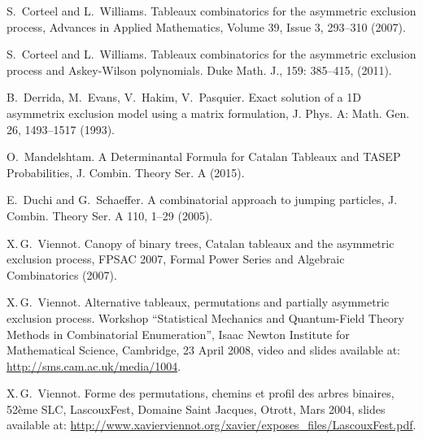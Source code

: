 \documentclass[11pt]{article}
\numberwithin{equation}{section}
\theoremstyle{plain}
\theoremstyle{definition}
\theoremstyle{remark}
\begin{document}
\begin{thebibliography}{99}


 S.~Corteel and L.~Williams. Tableaux combinatorics for the asymmetric exclusion process, Advances in Applied Mathematics, Volume 39, Issue 3, 293--310 (2007).

 S.~Corteel and L.~Williams. Tableaux combinatorics for the asymmetric exclusion process and Askey-Wilson polynomials. Duke Math. J., 159: 385--415, (2011).

 B.~Derrida, M.~Evans, V.~Hakim, V.~Pasquier. Exact solution of a 1D asymmetrix exclusion model using a matrix formulation, J. Phys. A: Math. Gen. 26, 1493--1517 (1993).

 O.~Mandelshtam. A Determinantal Formula for Catalan Tableaux and TASEP Probabilities, J. Combin. Theory Ser. A (2015).

 E.\ Duchi and G.\ Schaeffer. A combinatorial approach to jumping particles, J. Combin. Theory Ser. A 110, 1--29 (2005).


 X.\,G.~Viennot. Canopy of binary trees, Catalan tableaux and the asymmetric exclusion process, FPSAC 2007, Formal Power Series and Algebraic Combinatorics (2007).

 X.\,G.~Viennot. Alternative tableaux, permutations and partially asymmetric exclusion process. Workshop ``Statistical Mechanics and Quantum-Field Theory Methods in Combinatorial Enumeration'', Isaac Newton Institute for Mathematical Science, Cambridge, 23 April 2008, video and slides available at: \url{http://sms.cam.ac.uk/media/1004}. 

  X.\,G.~Viennot. Forme des permutations, chemins et profil des arbres binaires, 52\`{e}me SLC, LascouxFest, Domaine Saint Jacques, Otrott, Mars 2004, slides available at: \url{http://www.xavierviennot.org/xavier/exposes_files/LascouxFest.pdf}.




\end{thebibliography}
\end{document}
